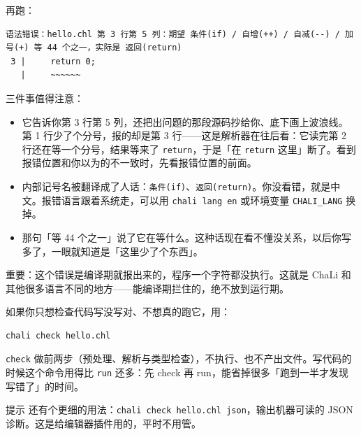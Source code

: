 再跑：

\par
\medskip
\begin{lstlisting}[style=out]
语法错误：hello.chl 第 3 行第 5 列：期望 条件(if) / 自增(++) / 自减(--) / 加号(+) 等 44 个之一，实际是 返回(return)
 3 |     return 0;
   |     ~~~~~~
\end{lstlisting}
\par
\medskip

三件事值得注意：

\begin{itemize}

\item 它告诉你第 3 行第 5 列，还把出问题的那段源码抄给你、底下画上波浪线。第 1 行少了个分号，报的却是第 3 行——这是解析器在往后看：它读完第 2 行还在等一个分号，结果等来了 \texttt{return}，于是「在 \texttt{return} 这里」断了。看到报错位置和你以为的不一致时，先看报错位置的前面。

\item 内部记号名被翻译成了人话：\texttt{条件(\allowbreak{}if)\allowbreak{}}、\texttt{返回(\allowbreak{}return)\allowbreak{}}。你没看错，就是中文。报错语言跟着系统走，可以用 \texttt{chali lang en} 或环境变量 \texttt{CHALI\_LANG} 换掉。

\item 那句「等 44 个之一」说了它在等什么。这种话现在看不懂没关系，以后你写多了，一眼就知道是「这里少了个东西」。

\end{itemize}

重要：这个错误是编译期就报出来的，程序一个字符都没执行。这就是 ChaLi 和其他很多语言不同的地方——能编译期拦住的，绝不放到运行期。

如果你只想检查代码写没写对、不想真的跑它，用：

\par
\medskip
\begin{lstlisting}[style=sh]
chali check hello.chl
\end{lstlisting}
\par
\medskip

\texttt{check} 做前两步（预处理、解析与类型检查），不执行、也不产出文件。写代码的时候这个命令用得比 \texttt{run} 还多：先 check 再 run，能省掉很多「跑到一半才发现写错了」的时间。

\begin{tip}{提示}
还有个更细的用法：\texttt{chali check hello.\allowbreak{}chl json}，输出机器可读的 JSON 诊断。这是给编辑器插件用的，平时不用管。
\end{tip}

